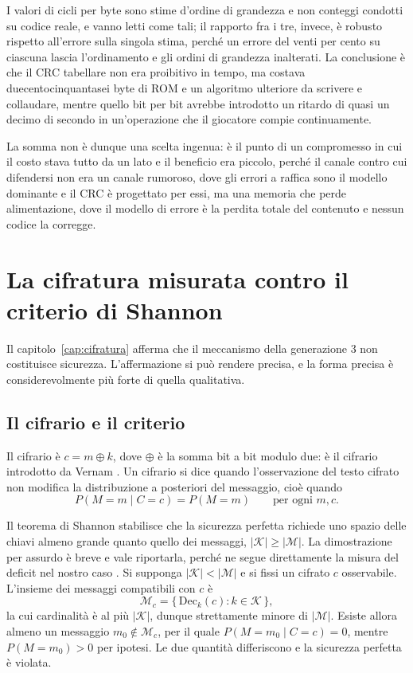 I valori di cicli per byte sono stime d'ordine di grandezza e non conteggi condotti su codice reale, e vanno letti come tali; il rapporto fra i tre, invece, è robusto rispetto all'errore sulla singola stima, perché un errore del venti per cento su ciascuna lascia l'ordinamento e gli ordini di grandezza inalterati. La conclusione è che il CRC tabellare non era proibitivo in tempo, ma costava duecentocinquantasei byte di ROM e un algoritmo ulteriore da scrivere e collaudare, mentre quello bit per bit avrebbe introdotto un ritardo di quasi un decimo di secondo in un'operazione che il giocatore compie continuamente.

La somma non è dunque una scelta ingenua: è il punto di un compromesso in cui il costo stava tutto da un lato e il beneficio era piccolo, perché il canale contro cui difendersi non era un canale rumoroso, dove gli errori a raffica sono il modello dominante e il CRC è progettato per essi, ma una memoria che perde alimentazione, dove il modello di errore è la perdita totale del contenuto e nessun codice la corregge.

\section{La cifratura misurata contro il criterio di Shannon}

Il capitolo~\ref{cap:cifratura} afferma che il meccanismo della generazione 3 non costituisce sicurezza. L'affermazione si può rendere precisa, e la forma precisa è considerevolmente più forte di quella qualitativa.

\subsection{Il cifrario e il criterio}

Il cifrario è $c = m \oplus k$, dove $\oplus$ è la somma bit a bit modulo due: è il cifrario introdotto da Vernam \cite{vernam26}. Un cifrario si dice  quando l'osservazione del testo cifrato non modifica la distribuzione a posteriori del messaggio, cioè quando
\[
P(M = m \mid C = c) = P(M = m) \qquad \text{per ogni } m, c.
\]

Il teorema di Shannon \cite{shannon49} stabilisce che la sicurezza perfetta richiede uno spazio delle chiavi almeno grande quanto quello dei messaggi, $|\mathcal{K}| \ge |\mathcal{M}|$. La dimostrazione per assurdo è breve e vale riportarla, perché ne segue direttamente la misura del deficit nel nostro caso \cite{katz-lindell}. Si supponga $|\mathcal{K}| < |\mathcal{M}|$ e si fissi un cifrato $c$ osservabile. L'insieme dei messaggi compatibili con $c$ è
\[
\mathcal{M}_c = \{\,\mathrm{Dec}_k(c) : k \in \mathcal{K}\,\},
\]
la cui cardinalità è al più $|\mathcal{K}|$, dunque strettamente minore di $|\mathcal{M}|$. Esiste allora almeno un messaggio $m_0 \notin \mathcal{M}_c$, per il quale $P(M = m_0 \mid C = c) = 0$, mentre $P(M = m_0) > 0$ per ipotesi. Le due quantità differiscono e la sicurezza perfetta è violata.

